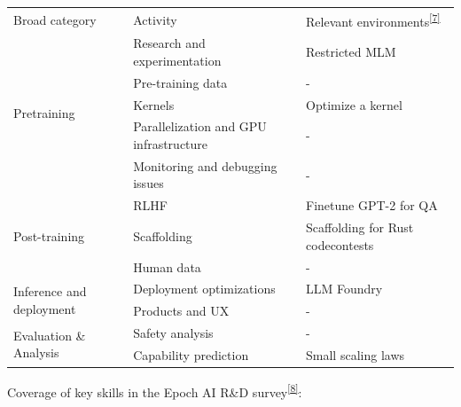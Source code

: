 \documentclass[
]{article}
\begin{document}
\begin{longtable}[]{@{}lll@{}}
\toprule\noalign{}
\endhead
\bottomrule\noalign{}
\endlastfoot
{Broad category} & {Activity} & {Relevant
environments}\textsuperscript{\label{ftnt_ref7}\hyperref[ftnt7]{{[}7{]}}}{~} \\
\multirow{5}{=}{{Pretraining}} & {Research and experimentation} &
{Restricted MLM} \\
& {Pre-training d}{ata} & {-} \\
& {Kernels} & {Optimize a kernel} \\
& {Parallelization and GPU infrastructure} & {-} \\
& {Monitoring and debugging issues} & {-} \\
\multirow{3}{=}{{Post-training}} & {RLHF} & {Finetune GPT-2 for QA} \\
& {Scaffolding } & {Scaffolding for Rust codecontests} \\
& {Human data} & {-} \\
\multirow{2}{=}{{Inference and deployment}} & {Deployment optimizations}
& {LLM Foundry} \\
& {Products and UX} & {-} \\
\multirow{2}{=}{{Evaluation \& Analysis}} & {Safety analysis} & {-} \\
& {Capability prediction} & {Small scaling laws} \\
\end{longtable}

{}

{Coverage of key skills in the Epoch AI R\&D
survey}\textsuperscript{\label{ftnt_ref8}\hyperref[ftnt8]{{[}8{]}}}{:}
\end{document}
